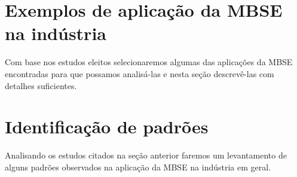 \section{Exemplos de aplicação da MBSE na indústria}

Com base nos estudos eleitos selecionaremos algumas das aplicações da MBSE encontradas para que possamos analisá-las e nesta seção descrevê-las com detalhes suficientes.

\section{Identificação de padrões}

Analisando os estudos citados na seção anterior faremos um levantamento de alguns padrões observados na aplicação da MBSE na indústria em geral.